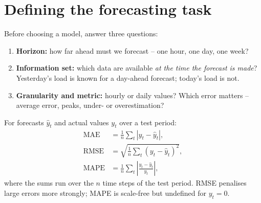 \documentclass[
  letterpaper,
  DIV=11,
  numbers=noendperiod]{scrreprt}
\providecommand{\tightlist}{%
  \setlength{\itemsep}{0pt}\setlength{\parskip}{0pt}}\usepackage{longtable,booktabs,array}
\begin{document}
\section{Defining the forecasting
task}\label{defining-the-forecasting-task}

Before choosing a model, answer three questions:

\begin{enumerate}
\def\labelenumi{\arabic{enumi}.}
\tightlist
\item
  \textbf{Horizon:} how far ahead must we forecast -- one hour, one day,
  one week?
\item
  \textbf{Information set:} which data are available \emph{at the time
  the forecast is made}? Yesterday's load is known for a day-ahead
  forecast; today's load is not.
\item
  \textbf{Granularity and metric:} hourly or daily values? Which error
  matters -- average error, peaks, under- or overestimation?
\end{enumerate}

\begin{tcolorbox}[enhanced jigsaw, left=2mm, title=\textcolor{quarto-callout-note-color}{\faInfo}\hspace{0.5em}{Definition: Forecast error metrics}, opacityback=0, breakable, rightrule=.15mm, arc=.35mm, toptitle=1mm, colbacktitle=quarto-callout-note-color!10!white, opacitybacktitle=0.6, coltitle=black, colframe=quarto-callout-note-color-frame, bottomrule=.15mm, leftrule=.75mm, bottomtitle=1mm, titlerule=0mm, toprule=.15mm, colback=white]

For forecasts \(\hat y_t\) and actual values \(y_t\) over a test period:
\[\begin{aligned} \text{MAE} &= \frac1n\sum_{t}|y_t - \hat y_t|, \\ \text{RMSE} &= \sqrt{\frac1n\sum_{t}(y_t - \hat y_t)^2}, \\ \text{MAPE} &= \frac1n\sum_{t}\left|\frac{y_t - \hat y_t}{y_t}\right|, \end{aligned}\]
where the sums run over the \(n\) time steps of the test period. RMSE
penalises large errors more strongly; MAPE is scale-free but undefined
for \(y_t = 0\).

\end{tcolorbox}
\end{document}
